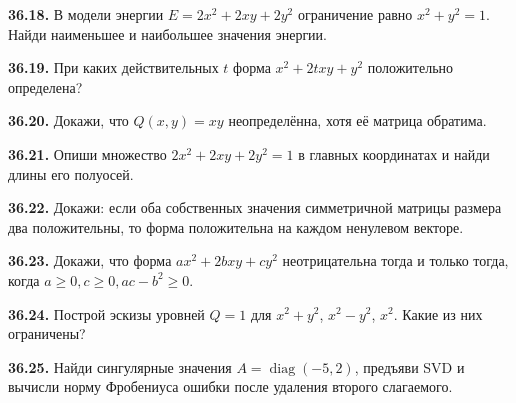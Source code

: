 \noindent\begin{minipage}[t]{\linewidth}\textbf{36.18.}\starmark{} В модели энергии \(E=2x^2+2xy+2y^2\) ограничение равно \(x^2+y^2=1\). Найди наименьшее и наибольшее значения энергии.\par\end{minipage}\par
\noindent\begin{minipage}[t]{\linewidth}\textbf{36.19.} При каких действительных \(t\) форма \(x^2+2txy+y^2\) положительно определена?\par\end{minipage}\par
\noindent\begin{minipage}[t]{\linewidth}\textbf{36.20.} Докажи, что \(Q(x,y)=xy\) неопределённа, хотя её матрица обратима.\par\end{minipage}\par
\noindent\begin{minipage}[t]{\linewidth}\textbf{36.21.} Опиши множество \(2x^2+2xy+2y^2=1\) в главных координатах и найди длины его полуосей.\par\end{minipage}\par
\noindent\begin{minipage}[t]{\linewidth}\textbf{36.22.} Докажи: если оба собственных значения симметричной матрицы размера два положительны, то форма положительна на каждом ненулевом векторе.\par\end{minipage}\par
\noindent\begin{minipage}[t]{\linewidth}\textbf{36.23.}\starmark{} Докажи, что форма \(ax^2+2bxy+cy^2\) неотрицательна тогда и только тогда, когда \(a\ge0,c\ge0,ac-b^2\ge0\).\par\end{minipage}\par
\noindent\begin{minipage}[t]{\linewidth}\textbf{36.24.}\starmark{} Построй эскизы уровней \(Q=1\) для \(x^2+y^2\), \(x^2-y^2\), \(x^2\). Какие из них ограничены?\par\end{minipage}\par
\noindent\begin{minipage}[t]{\linewidth}\textbf{36.25.} Найди сингулярные значения \(A=\operatorname{diag}(-5,2)\), предъяви SVD и вычисли норму Фробениуса ошибки после удаления второго слагаемого.\par\end{minipage}\par
